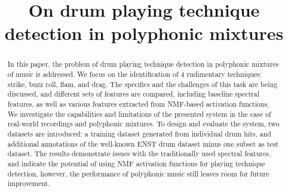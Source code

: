 \documentclass{article}
\title{On drum playing technique detection in polyphonic mixtures}
\begin{document}
%
\maketitle
%
\begin{abstract}

In this paper, the problem of drum playing technique detection in polyphonic mixtures of music is addressed. We focus on the identification of 4 rudimentary techniques: strike, buzz roll, flam, and drag. The specifics and the challenges of this task are being discussed, and different sets of features are compared, including baseline spectral features, as well as various features extracted from NMF-based activation functions. We investigate the capabilities and limitations of
the presented system in the case of real-world recordings and polyphonic mixtures. To design and evaluate the system, two datasets are introduced: a
training dataset generated from individual drum hits, and additional annotations of the well-known ENST drum dataset minus one subset as test dataset. The results demonstrate issues with the traditionally used spectral features, and indicate the potential of using NMF activation functions for playing technique detection, however, the performance of polyphonic music still leaves room for future improvement.
\end{abstract}
\end{document}
